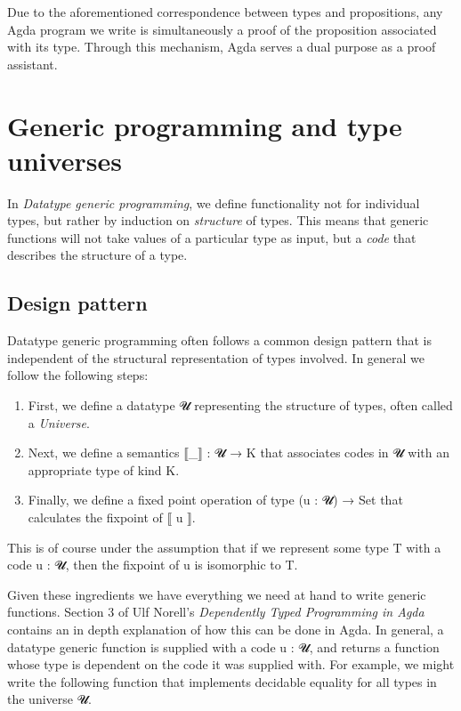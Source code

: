 \documentclass[a4paper,msc,twosized=semi]{uustthesis}
\let\oldemph\emph
\renewcommand\emph[1]{{\large\oldemph{#1}}}
\newcommand{\agda}[1]{{\agdafontinline\color{agdacolor}#1}}
\begin{document}
  Due to the aforementioned correspondence between types and propositions, any Agda 
  program we write is simultaneously a proof of the proposition associated with its 
  type. Through this mechanism, Agda serves a dual purpose as a proof assistant. 

\section{Generic programming and type universes}

  In \emph{Datatype generic programming}, we define functionality not for individual 
  types, but rather by induction on \emph{structure} of types. This means that generic 
  functions will not take values of a particular type as input, but a \emph{code} that 
  describes the structure of a type. 

\subsection{Design pattern}\label{sec:tudesignpattern}

  Datatype generic programming often follows a common design pattern that is 
  independent of the structural representation of types involved. In general 
  we follow the following steps: 

  \begin{enumerate}
    \item
      First, we define a datatype \agda{𝓤} representing the structure of types, 
      often called a \emph{Universe}. 
    \item 
      Next, we define a semantics \agda{⟦\_⟧ : 𝓤 → K} that associates codes in \agda{𝓤} 
      with an appropriate type of kind \agda{K}. 
    \item 
      Finally, we define a fixed point operation of type \agda{(u : 𝓤) → Set}
      that calculates the fixpoint of \agda{⟦ u ⟧}. 
  \end{enumerate}

  This is of course under the assumption that if we represent some type 
  \agda{T} with a code \agda{u : 𝓤}, then the fixpoint of \agda{u} is isomorphic to \agda{T}. 

  Given these ingredients we have everything we need at hand to write generic 
  functions. Section $3$ of Ulf Norell's \emph{Dependently Typed Programming 
  in Agda} \cite{norell2008dependently} contains an in depth explanation of 
  how this can be done in Agda. In general, a datatype generic function is supplied
  with a code \agda{u : 𝓤}, and returns a function whose type is dependent on the 
  code it was supplied with. For example, we might write the following function 
  that implements decidable equality for all types in the universe \agda{𝓤}. 
\end{document}
